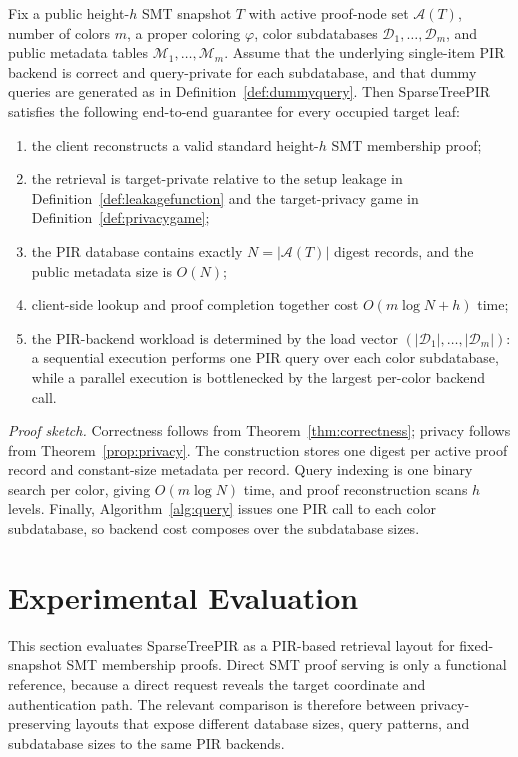 \begin{theorem}
\label{thm:endtoend}
Fix a public height-$h$ SMT snapshot $T$ with active proof-node set $\mathcal{A}(T)$, number of colors $m$, a proper coloring $\varphi$, color subdatabases $\mathcal{D}_1,\ldots,\mathcal{D}_m$, and public metadata tables $\mathcal{M}_1,\ldots,\mathcal{M}_m$. Assume that the underlying single-item PIR backend is correct and query-private for each subdatabase, and that dummy queries are generated as in Definition~\ref{def:dummyquery}. Then SparseTreePIR satisfies the following end-to-end guarantee for every occupied target leaf:
\begin{enumerate}[leftmargin=2em]
  \item the client reconstructs a valid standard height-$h$ SMT membership proof;
  \item the retrieval is target-private relative to the setup leakage in Definition~\ref{def:leakagefunction} and the target-privacy game in Definition~\ref{def:privacygame};
  \item the PIR database contains exactly $N=|\mathcal{A}(T)|$ digest records, and the public metadata size is $O(N)$;
  \item client-side lookup and proof completion together cost $O(m\log N+h)$ time;
  \item the PIR-backend workload is determined by the load vector $(|\mathcal{D}_1|,\ldots,|\mathcal{D}_m|)$: a sequential execution performs one PIR query over each color subdatabase, while a parallel execution is bottlenecked by the largest per-color backend call.
\end{enumerate}
\end{theorem}

\noindent\emph{Proof sketch.}
Correctness follows from Theorem~\ref{thm:correctness}; privacy follows from Theorem~\ref{prop:privacy}. The construction stores one digest per active proof record and constant-size metadata per record. Query indexing is one binary search per color, giving $O(m\log N)$ time, and proof reconstruction scans $h$ levels. Finally, Algorithm~\ref{alg:query} issues one PIR call to each color subdatabase, so backend cost composes over the subdatabase sizes.


\section{Experimental Evaluation}
\label{sec:experiments}

This section evaluates SparseTreePIR as a PIR-based retrieval layout for fixed-snapshot SMT membership proofs. Direct SMT proof serving is only a functional reference, because a direct request reveals the target coordinate and authentication path. The relevant comparison is therefore between privacy-preserving layouts that expose different database sizes, query patterns, and subdatabase sizes to the same PIR backends.

